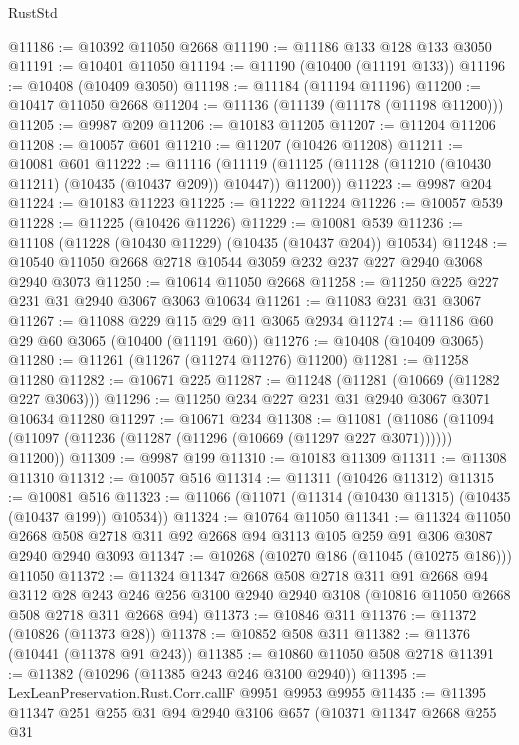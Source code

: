 \begin{lexlean}{RustStd}
\begin{coremodule}
@11186 := @10392 @11050 @2668
@11190 := @11186 @133 @128 @133 @3050
@11191 := @10401 @11050
@11194 := @11190 (@10400 (@11191 @133))
@11196 := @10408 (@10409 @3050)
@11198 := @11184 (@11194 @11196)
@11200 := @10417 @11050 @2668
@11204 := @11136 (@11139 (@11178 (@11198 @11200)))
@11205 := @9987 @209
@11206 := @10183 @11205
@11207 := @11204 @11206
@11208 := @10057 @601
@11210 := @11207 (@10426 @11208)
@11211 := @10081 @601
@11222 := @11116
    (@11119 (@11125 (@11128 (@11210 (@10430 @11211) (@10435 (@10437 @209)) @10447)) @11200))
@11223 := @9987 @204
@11224 := @10183 @11223
@11225 := @11222 @11224
@11226 := @10057 @539
@11228 := @11225 (@10426 @11226)
@11229 := @10081 @539
@11236 := @11108 (@11228 (@10430 @11229) (@10435 (@10437 @204)) @10534)
@11248 := @10540 @11050 @2668 @2718 @10544 @3059 @232 @237 @227 @2940 @3068 @2940 @3073
@11250 := @10614 @11050 @2668
@11258 := @11250 @225 @227 @231 @31 @2940 @3067 @3063 @10634
@11261 := @11083 @231 @31 @3067
@11267 := @11088 @229 @115 @29 @11 @3065 @2934
@11274 := @11186 @60 @29 @60 @3065 (@10400 (@11191 @60))
@11276 := @10408 (@10409 @3065)
@11280 := @11261 (@11267 (@11274 @11276) @11200)
@11281 := @11258 @11280
@11282 := @10671 @225
@11287 := @11248 (@11281 (@10669 (@11282 @227 @3063)))
@11296 := @11250 @234 @227 @231 @31 @2940 @3067 @3071 @10634 @11280
@11297 := @10671 @234
@11308 := @11081
    (@11086 (@11094 (@11097 (@11236 (@11287 (@11296 (@10669 (@11297 @227 @3071)))))) @11200))
@11309 := @9987 @199
@11310 := @10183 @11309
@11311 := @11308 @11310
@11312 := @10057 @516
@11314 := @11311 (@10426 @11312)
@11315 := @10081 @516
@11323 := @11066 (@11071 (@11314 (@10430 @11315) (@10435 (@10437 @199)) @10534))
@11324 := @10764 @11050
@11341 := @11324
    @11050
    @2668
    @508
    @2718
    @311
    @92
    @2668
    @94
    @3113
    @105
    @259
    @91
    @306
    @3087
    @2940
    @2940
    @3093
@11347 := @10268 (@10270 @186 (@11045 (@10275 @186))) @11050
@11372 := @11324
    @11347
    @2668
    @508
    @2718
    @311
    @91
    @2668
    @94
    @3112
    @28
    @243
    @246
    @256
    @3100
    @2940
    @2940
    @3108
    (@10816 @11050 @2668 @508 @2718 @311 @2668 @94)
@11373 := @10846 @311
@11376 := @11372 (@10826 (@11373 @28))
@11378 := @10852 @508 @311
@11382 := @11376 (@10441 (@11378 @91 @243))
@11385 := @10860 @11050 @508 @2718
@11391 := @11382 (@10296 (@11385 @243 @246 @3100 @2940))
@11395 := LexLeanPreservation.Rust.Corr.callF @9951 @9953 @9955
@11435 := @11395
    @11347
    @251
    @255
    @31
    @94
    @2940
    @3106
    @657
    (@10371
      @11347
      @2668
      @255
      @31

\end{coremodule}
\end{lexlean}
